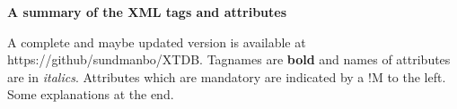 \documentclass[10pt]{article}
\begin{document}



{\bf \Large A summary of the XML tags and attributes}\label{sc:xtdb}

A complete and maybe updated version is available at
https://github/sundmanbo/XTDB.  Tagnames are {\bf bold} and names of
attributes are in {\em italics}.  Attributes which are mandatory are
indicated by a !M to the left.  Some explanations at the end.
\end{document}
